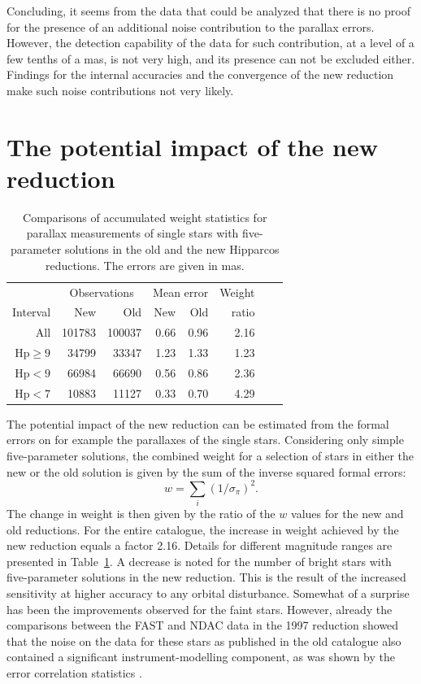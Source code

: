 \documentclass{aa}
\begin{document}
Concluding, it seems from the data that could be analyzed that there is no
proof for the presence of an additional noise contribution to the parallax
errors. However, the detection capability of the data for such contribution, 
at a level of a few tenths of a mas, is not very high, and its presence 
can not be excluded either. Findings for the internal accuracies and the
convergence of the new reduction make such noise contributions not very 
likely. 

\section{The potential impact of the new reduction}
\label{sec:impact}

\begin{table}
\caption[]{Comparisons of accumulated weight statistics for parallax
measurements of single stars with five-parameter solutions in the old and 
the new Hipparcos reductions. The errors are given in mas.}
\begin{tabular}{rrrrrrll}\hline
& \multicolumn{2}{c}{Observations} & \multicolumn{2}{c}{Mean error} & Weight\\
Interval & New & Old & New & Old & ratio\\
\hline
All & 101783 & 100037 & 0.66 & 0.96 & 2.16 \\
$\mathrm{Hp}\ge 9$ & 34799 & 33347 & 1.23 & 1.33 & 1.23 \\
$\mathrm{Hp}<9$ & 66984 & 66690 & 0.56 & 0.86 & 2.36 \\
$\mathrm{Hp}<7$ & 10883 & 11127 & 0.33 & 0.70 & 4.29 \\ 
\hline
\end{tabular}
\label{tab:weights}
\end{table}
The potential impact of the new reduction can be estimated from the 
formal errors on for example the parallaxes of the single stars. Considering
only simple five-parameter solutions, the combined weight for a selection of 
stars in either the new or the old solution is given by the sum of the
inverse squared formal errors:
\begin{equation}
w=\sum_i (1/\sigma_\pi)^2.
\end{equation} 
The change in weight is then given by the ratio of the $w$ values for the
new and old reductions. For the entire catalogue, the increase in weight 
achieved by the new reduction equals a factor 2.16. Details for 
different magnitude ranges are presented in Table~\ref{tab:weights}.
A decrease is noted for the number of bright stars with five-parameter
solutions in the new reduction. This is the result of the increased 
sensitivity at higher 
accuracy to any orbital disturbance. Somewhat of a surprise has been the 
improvements observed for the faint stars. However, already the 
comparisons between the FAST and NDAC data in the 1997 reduction showed
that the noise on the data for these stars as published in the old catalogue 
also contained a significant instrument-modelling component, as was shown by
the error correlation statistics \citep[see Volume 3 of ][]{esa97}.
\end{document}
